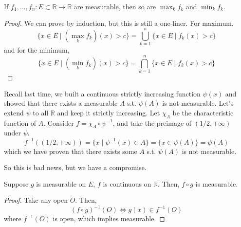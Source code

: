   \begin{theorem}
    If $f_1, \ldots, f_n: E \subset \mathbb{R} \to \mathbb{R}$ are measurable, then so are $\max_k f_k$ and $\min_k f_k$. 
  \end{theorem}
  \begin{proof}
    We can prove by induction, but this is still a one-liner. For maximum, 
    \begin{equation}
      \{x \in E \mid (\max_k{f_k})(x) > c \} = \bigcup_{k=1}^n \{x \in E \mid f_k (x) > c\} 
    \end{equation}
    and for the minimum, 
    \begin{equation}
      \{x \in E \mid (\min_k{f_k})(x) > c \} = \bigcap_{k=1}^n \{x \in E \mid f_k (x) > c\} 
    \end{equation}
  \end{proof} 

  \begin{example}
    Recall last time, we built a continuous strictly increasing function $\psi(x)$ and showed that there exists a measurable $A$ s.t. $\psi(A)$ is not measurable. Let's extend $\psi$ to all $\mathbb{R}$ and keep it strictly increasing. Let $\chi_A$ be the characteristic function of $A$. Consider $f = \chi_A \circ \psi^{-1}$, and take the preimage of $(1/2, +\infty)$ under $\psi$. 
    \begin{equation}
      f^{-1} ((1/2, +\infty)) = \{x \mid \psi^{-1} (x) \in A \}  = \{x \in \psi(A)\} = \psi(A)
    \end{equation}
    which we have proven  that there exists some $A$ s.t. $\psi(A)$ is not measurable. 
  \end{example}

  So this is bad news, but we have a compromise. 

  \begin{theorem}
    Suppose $g$ is measurable on $E$, $f$ is continuous on $\mathbb{R}$. Then, $f \circ g$ is measurable. 
  \end{theorem}
  \begin{proof}
    Take any open $O$. Then, 
    \begin{equation}
      (f \circ g)^{-1} (O) \iff g(x) \in f^{-1} (O) 
    \end{equation}
    where $f^{-1} (O)$ is open, which implies measurable. 
  \end{proof}

